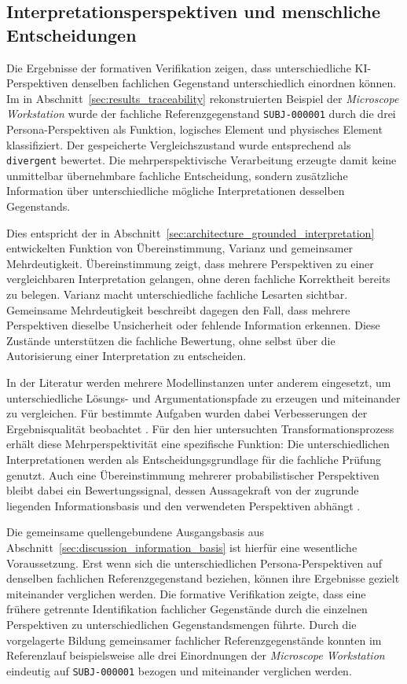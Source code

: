 \subsection{Interpretationsperspektiven und menschliche Entscheidungen}
\label{sec:discussion_human_authority}

Die Ergebnisse der formativen Verifikation zeigen, dass unterschiedliche
KI-Perspektiven denselben fachlichen Gegenstand unterschiedlich einordnen
können. Im in Abschnitt~\ref{sec:results_traceability} rekonstruierten
Beispiel der \emph{Microscope Workstation} wurde der fachliche
Referenzgegenstand \texttt{SUBJ-000001} durch die drei
Persona-Perspektiven als Funktion, logisches Element und physisches Element
klassifiziert. Der gespeicherte Vergleichszustand wurde entsprechend als
\texttt{divergent} bewertet. Die mehrperspektivische Verarbeitung erzeugte
damit keine unmittelbar übernehmbare fachliche Entscheidung, sondern
zusätzliche Information über unterschiedliche mögliche Interpretationen
desselben Gegenstands.

Dies entspricht der in
Abschnitt~\ref{sec:architecture_grounded_interpretation} entwickelten
Funktion von Übereinstimmung, Varianz und gemeinsamer Mehrdeutigkeit.
Übereinstimmung zeigt, dass mehrere Perspektiven zu einer vergleichbaren
Interpretation gelangen, ohne deren fachliche Korrektheit bereits zu
belegen. Varianz macht unterschiedliche fachliche Lesarten sichtbar.
Gemeinsame Mehrdeutigkeit beschreibt dagegen den Fall, dass mehrere
Perspektiven dieselbe Unsicherheit oder fehlende Information erkennen. Diese
Zustände unterstützen die fachliche Bewertung, ohne selbst über die
Autorisierung einer Interpretation zu entscheiden.

In der Literatur werden mehrere Modellinstanzen unter anderem eingesetzt,
um unterschiedliche Lösungs- und Argumentationspfade zu erzeugen und
miteinander zu vergleichen. Für bestimmte Aufgaben wurden dabei
Verbesserungen der Ergebnisqualität beobachtet \cite{Du2024}. Für den hier
untersuchten Transformationsprozess erhält diese Mehrperspektivität eine
spezifische Funktion: Die unterschiedlichen Interpretationen werden als
Entscheidungsgrundlage für die fachliche Prüfung genutzt. Auch eine
Übereinstimmung mehrerer probabilistischer Perspektiven bleibt dabei ein
Bewertungssignal, dessen Aussagekraft von der zugrunde liegenden
Informationsbasis und den verwendeten Perspektiven abhängt
\cite{Sunkaraneni2026}.

Die gemeinsame quellengebundene Ausgangsbasis aus
Abschnitt~\ref{sec:discussion_information_basis} ist hierfür eine wesentliche
Voraussetzung. Erst wenn sich die unterschiedlichen Persona-Perspektiven auf
denselben fachlichen Referenzgegenstand beziehen, können ihre Ergebnisse
gezielt miteinander verglichen werden. Die formative Verifikation zeigte,
dass eine frühere getrennte Identifikation fachlicher Gegenstände durch die
einzelnen Perspektiven zu unterschiedlichen Gegenstandsmengen führte. Durch
die vorgelagerte Bildung gemeinsamer fachlicher Referenzgegenstände konnten
im Referenzlauf beispielsweise alle drei Einordnungen der
\emph{Microscope Workstation} eindeutig auf \texttt{SUBJ-000001} bezogen
und miteinander verglichen werden.

